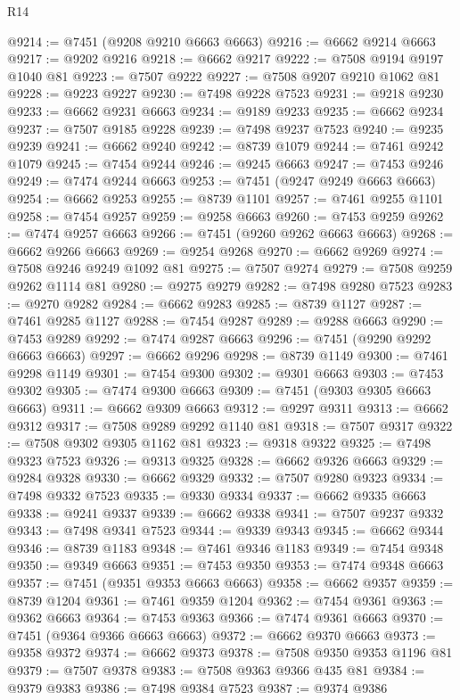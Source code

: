 \begin{lexlean}{R14}
\begin{coremodule}
@9214 := @7451 (@9208 @9210 @6663 @6663)
@9216 := @6662 @9214 @6663
@9217 := @9202 @9216
@9218 := @6662 @9217
@9222 := @7508 @9194 @9197 @1040 @81
@9223 := @7507 @9222
@9227 := @7508 @9207 @9210 @1062 @81
@9228 := @9223 @9227
@9230 := @7498 @9228 @7523
@9231 := @9218 @9230
@9233 := @6662 @9231 @6663
@9234 := @9189 @9233
@9235 := @6662 @9234
@9237 := @7507 @9185 @9228
@9239 := @7498 @9237 @7523
@9240 := @9235 @9239
@9241 := @6662 @9240
@9242 := @8739 @1079
@9244 := @7461 @9242 @1079
@9245 := @7454 @9244
@9246 := @9245 @6663
@9247 := @7453 @9246
@9249 := @7474 @9244 @6663
@9253 := @7451 (@9247 @9249 @6663 @6663)
@9254 := @6662 @9253
@9255 := @8739 @1101
@9257 := @7461 @9255 @1101
@9258 := @7454 @9257
@9259 := @9258 @6663
@9260 := @7453 @9259
@9262 := @7474 @9257 @6663
@9266 := @7451 (@9260 @9262 @6663 @6663)
@9268 := @6662 @9266 @6663
@9269 := @9254 @9268
@9270 := @6662 @9269
@9274 := @7508 @9246 @9249 @1092 @81
@9275 := @7507 @9274
@9279 := @7508 @9259 @9262 @1114 @81
@9280 := @9275 @9279
@9282 := @7498 @9280 @7523
@9283 := @9270 @9282
@9284 := @6662 @9283
@9285 := @8739 @1127
@9287 := @7461 @9285 @1127
@9288 := @7454 @9287
@9289 := @9288 @6663
@9290 := @7453 @9289
@9292 := @7474 @9287 @6663
@9296 := @7451 (@9290 @9292 @6663 @6663)
@9297 := @6662 @9296
@9298 := @8739 @1149
@9300 := @7461 @9298 @1149
@9301 := @7454 @9300
@9302 := @9301 @6663
@9303 := @7453 @9302
@9305 := @7474 @9300 @6663
@9309 := @7451 (@9303 @9305 @6663 @6663)
@9311 := @6662 @9309 @6663
@9312 := @9297 @9311
@9313 := @6662 @9312
@9317 := @7508 @9289 @9292 @1140 @81
@9318 := @7507 @9317
@9322 := @7508 @9302 @9305 @1162 @81
@9323 := @9318 @9322
@9325 := @7498 @9323 @7523
@9326 := @9313 @9325
@9328 := @6662 @9326 @6663
@9329 := @9284 @9328
@9330 := @6662 @9329
@9332 := @7507 @9280 @9323
@9334 := @7498 @9332 @7523
@9335 := @9330 @9334
@9337 := @6662 @9335 @6663
@9338 := @9241 @9337
@9339 := @6662 @9338
@9341 := @7507 @9237 @9332
@9343 := @7498 @9341 @7523
@9344 := @9339 @9343
@9345 := @6662 @9344
@9346 := @8739 @1183
@9348 := @7461 @9346 @1183
@9349 := @7454 @9348
@9350 := @9349 @6663
@9351 := @7453 @9350
@9353 := @7474 @9348 @6663
@9357 := @7451 (@9351 @9353 @6663 @6663)
@9358 := @6662 @9357
@9359 := @8739 @1204
@9361 := @7461 @9359 @1204
@9362 := @7454 @9361
@9363 := @9362 @6663
@9364 := @7453 @9363
@9366 := @7474 @9361 @6663
@9370 := @7451 (@9364 @9366 @6663 @6663)
@9372 := @6662 @9370 @6663
@9373 := @9358 @9372
@9374 := @6662 @9373
@9378 := @7508 @9350 @9353 @1196 @81
@9379 := @7507 @9378
@9383 := @7508 @9363 @9366 @435 @81
@9384 := @9379 @9383
@9386 := @7498 @9384 @7523
@9387 := @9374 @9386

\end{coremodule}
\end{lexlean}
